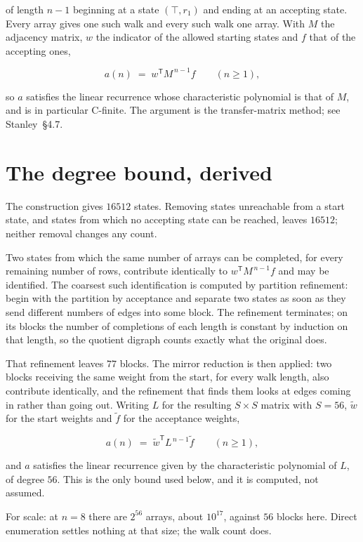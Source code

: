 \documentclass[11pt]{article}
\theoremstyle{definition}
\begin{document}
of length $n-1$ beginning at a state $(\top,r_1)$ and ending at an accepting state. Every array gives one such walk and every such walk one array. With $M$ the adjacency matrix, $w$ the indicator of the allowed starting states and $f$ that of the accepting ones,

\[a(n) \;=\; w^{\mathsf T} M^{\,n-1} f \qquad (n \ge 1),\]

so $a$ satisfies the linear recurrence whose characteristic polynomial is that of $M$, and is in particular C-finite. The argument is the transfer-matrix method; see Stanley~\S4.7.

\section{The degree bound, derived}

The construction gives $16512$ states. Removing states unreachable from a start state, and states from which no accepting state can be reached, leaves $16512$; neither removal changes any count.

Two states from which the same number of arrays can be completed, for every remaining number of rows, contribute identically to $w^{\mathsf T}M^{\,n-1}f$ and may be identified. The coarsest such identification is computed by partition refinement: begin with the partition by acceptance and separate two states as soon as they send different numbers of edges into some block. The refinement terminates; on its blocks the number of completions of each length is constant by induction on that length, so the quotient digraph counts exactly what the original does.

That refinement leaves $77$ blocks. The mirror reduction is then applied: two blocks receiving the same weight from the start, for every walk length, also contribute identically, and the refinement that finds them looks at edges coming in rather than going out. Writing $L$ for the resulting $S \times S$ matrix with $S = 56$, $\tilde w$ for the start weights and $\tilde f$ for the acceptance weights,

\[a(n) \;=\; \tilde w^{\mathsf T} L^{\,n-1} \tilde f \qquad (n \ge 1),\]

and $a$ satisfies the linear recurrence given by the characteristic polynomial of $L$, of degree $56$. This is the only bound used below, and it is computed, not assumed.

For scale: at $n = 8$ there are $2^{56}$ arrays, about $10^{17}$, against $56$ blocks here. Direct enumeration settles nothing at that size; the walk count does.
\end{document}

